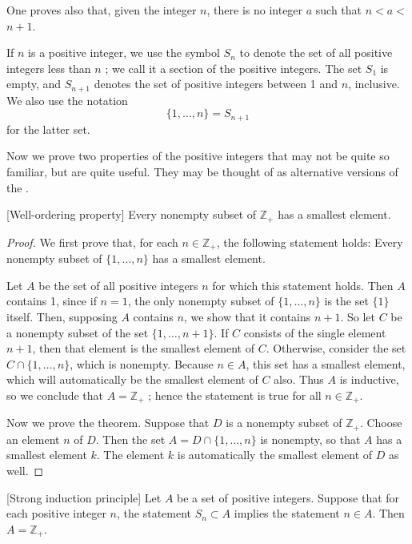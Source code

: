 One proves also that, given the integer \(n\), there is no integer \(a\) such 
that \(n < a <\) \(n + 1\).

If \(n\) is a positive integer, we use the symbol \(S_{n}\) to denote the 
set of all positive integers less than \(n\) ; we call it a section of the 
positive integers. The set \(S_{1}\) is empty, and \(S_{n + 1}\) denotes 
the set of positive integers between 1 and \(n\), inclusive. We also use the notation
\[
\{1,\ldots, n\} = S_{n + 1}
\]
for the latter set.

Now we prove two properties of the positive integers that may not be quite so familiar, 
but are quite useful. They may be thought of as alternative versions of the .

\begin{theorem}
\label{thm:\thetheorem}[Well-ordering property]
 Every nonempty subset of \(\mathbb{Z}_{+}\) has a smallest element.
\end{theorem}

\begin{proof}
 We first prove that, for each \(n \in {\mathbb{Z}}_{+}\), the following statement holds: Every nonempty subset of \(\{1,\ldots, n\}\) has a smallest element.

 Let \(A\) be the set of all positive integers \(n\) for which this statement holds. Then \(A\) contains 1, since if \(n = 1\), the only nonempty subset of \(\{1,\ldots, n\}\) is the set \(\{1\}\) itself. Then, supposing \(A\) contains \(n\), we show that it contains \(n + 1\). So let \(C\) be a nonempty subset of the set \(\{1,\ldots, n + 1\}\). If \(C\) consists of the single element \(n + 1\), then that element is the smallest element of \(C\). Otherwise, consider the set \(C \cap \{1,\ldots, n\}\), which is nonempty. Because \(n \in A\), this set has a smallest element, which will automatically be the smallest element of \(C\) also. Thus \(A\) is inductive, so we conclude that \(A = \mathbb{Z}_{+}\) ; hence the statement is true for all \(n \in {\mathbb{Z}}_{+}\).

 Now we prove the theorem. Suppose that \(D\) is a nonempty subset of \(\mathbb{Z}_{+}\). Choose an element \(n\) of \(D\). Then the set \(A = D \cap \{1,\ldots, n\}\) is nonempty, so that \(A\) has a smallest element \(k\). The element \(k\) is automatically the smallest element of \(D\) as well.
\end{proof}

\begin{theorem}
\label{thm:\thetheorem}[Strong induction principle]
 Let \(A\) be a set of positive integers. Suppose that for each positive integer \(n\), the statement \(S_{n} \subset A\) implies the statement \(n \in A\). Then \(A = \mathbb{Z}_{+}\).
\end{theorem}

